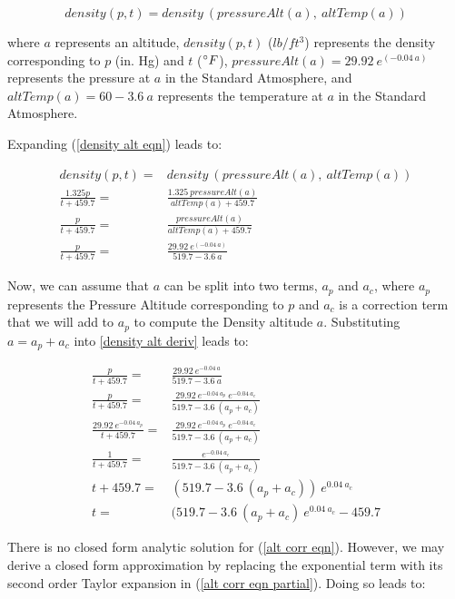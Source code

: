 \documentclass[10pt,a4paper]{article}
\begin{document}
\begin{equation}
\label{density alt eqn}
density (p, t) = density\ (pressureAlt (a),\ altTemp (a))
\end{equation}

where $a$ represents an altitude, $density (p, t)$ ($lb/ft^3$) represents the density corresponding to $p$ (in. Hg) and $t$ ($\degree F$), $pressureAlt (a) = 29.92\ e^{(- 0.04\ a)}$ represents the pressure at $a$ in the Standard Atmosphere, and $altTemp (a) = 60 - 3.6\ a$ represents the temperature at $a$ in the Standard Atmosphere.

Expanding (\ref{density alt eqn}) leads to:

\begin{align}
density (p, t) =& density\ (pressureAlt (a),\ altTemp (a))\\
\frac{1.325 p}{t + 459.7} =& \frac{1.325\ pressureAlt (a)}{altTemp (a) + 459.7}\\
\frac{p}{t + 459.7} =& \frac{pressureAlt (a)}{altTemp (a) + 459.7}\\
\label{density alt deriv}
\frac{p}{t + 459.7} =& \frac{29.92\ e^{(- 0.04\ a)}}{519.7 - 3.6\ a}
\end{align}

Now, we can assume that $a$ can be split into two terms, $a_{p}$ and $a_{c}$, where $a_{p}$ represents the Pressure Altitude corresponding to $p$ and $a_{c}$ is a correction term that we will add to $a_{p}$ to compute the Density altitude $a$. Substituting $a = a_{p} + a_{c}$ into \ref{density alt deriv} leads to:

\begin{align}
\frac{p}{t + 459.7} =& \frac{29.92\ e^{- 0.04\ a}}{519.7 - 3.6\ a}\\
\frac{p}{t + 459.7} =& \frac{29.92\ e^{- 0.04\ a_{p}}\ e^{- 0.04\ a_{c}}}{519.7 - 3.6\ (a_{p} + a_{c})}\\
\frac{29.92\ e^{- 0.04\ a_{p}}}{t + 459.7} =& \frac{29.92\ e^{- 0.04\ a_{p}}\ e^{- 0.04\ a_{c}}}{519.7 - 3.6\ (a_{p} + a_{c})}\\
\label{alt corr eqn partial}
\frac{1}{t + 459.7} =& \frac{e^{- 0.04\ a_{c}}}{519.7 - 3.6\ (a_{p} + a_{c})}\\
t + 459.7 =& (519.7 - 3.6\ (a_{p} + a_{c}))\ e^{0.04\ a_{c}}\\
\label{alt corr eqn}
t =& (519.7 - 3.6\ (a_{p} + a_{c})\ e^{0.04\ a_{c}} - 459.7
\end{align}

There is no closed form analytic solution for (\ref{alt corr eqn}). However, we may derive a closed form approximation by replacing the exponential term with its second order Taylor expansion in (\ref{alt corr eqn partial}). Doing so leads to:
\end{document}
